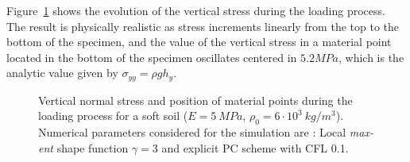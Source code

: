 Figure~\ref{fig:Block-LME3} shows the evolution of the vertical stress
during the loading process. The result is physically realistic as
stress increments linearly from the top to the bottom of the specimen,
and the value of the vertical stress in a material point located in
the bottom of the specimen oscillates centered in $5.2 MPa$, which is
the analytic value given by $\sigma_{yy} = \rho g h_y$.
\begin{figure}
  \centering
  \caption{Vertical normal stress and position of material points
    during the loading process for a soft soil ($E = 5\ MPa$, $\rho_0
    = 6\cdot 10^3\ kg/m^3$). Numerical parameters considered for the
    simulation are : Local \textit{max-ent} shape function $\gamma =3$
    and explicit PC scheme with CFL 0.1.}
  \label{fig:Block-LME3}
\end{figure}
